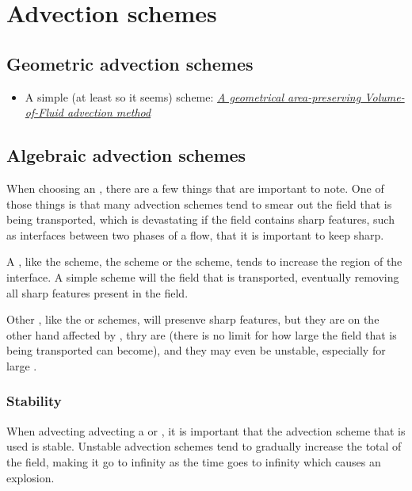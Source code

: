 \chapter{Advection schemes}

\section{Geometric advection schemes}

\begin{itemize}
    \item A simple (at least so it seems) scheme: \textit{\href{http://www.lmm.jussieu.fr/~zaleski/nota02.pdf}{A geometrical area-preserving Volume-of-Fluid advection method}}
\end{itemize}

\section{Algebraic advection schemes}

When choosing an , there are a few things that are important to note. One of those things is that many advection schemes tend to smear out the field that is being transported, which is devastating if the field contains sharp features, such as interfaces between two phases of a flow, that it is important to keep sharp.

A \LUDS, like the \UPWIND scheme, the \CD scheme or the \QUICK scheme, tends to increase the region of the interface. A simple \UPWIND scheme will  the field that is transported, eventually removing all sharp features present in the field.

Other \LUDSs, like the \CD or \QUICK schemes, will presenve sharp features, but they are on the other hand affected by , thry are \unbounded (there is no limit for how large the field that is being transported can become), and they may even be unstable, especially for large .

\subsection{Stability}

When advecting advecting a  or , it is important that the advection scheme that is used is stable. Unstable advection schemes tend to gradually increase the total  of the field, making it go to infinity as the time goes to infinity which causes an explosion.

